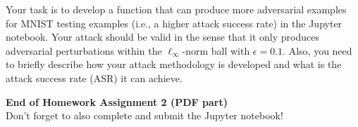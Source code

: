 \documentclass[11pt]{article}
\begin{document}
\directions{\clearpage}


\begin{problem}
\label{problem:bonus}
\rm
Your task is to develop a function  that can produce more adversarial examples for MNIST testing examples (i.e., a higher attack success rate) in the Jupyter notebook. Your attack should be valid in the sense that it only produces adversarial perturbations within the $\ell_\infty$-norm ball with $\epsilon=0.1$. Also, you need to briefly describe how your attack methodology is developed and what is the attack success rate (ASR) it can achieve.


\end{problem}




\vspace{20pt}


\begin{center}
{\bf End of Homework Assignment 2 (PDF part)} \\
Don't forget to also complete and submit the Jupyter notebook!
\end{center}


\clearpage



\end{document}
